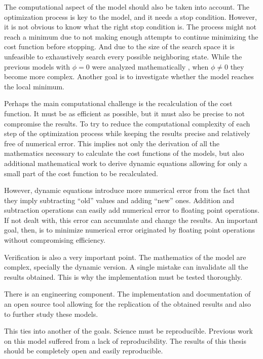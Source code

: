 The computational aspect of the model should also be taken into account.
The optimization process is key to the model, and it needs a stop condition.
However, it is not obvious to know what the right stop condition is.
The process might not reach a minimum due to not making enough attempts to continue minimizing the cost function before stopping.
And due to the size of the search space it is unfeasible to exhaustively search every possible neighboring state.
While the previous models with $\phi=0$ were analyzed mathematically \cite{Salge2015} \cite{Prokopenko2010}, when $\phi \neq 0$ they become more complex.
Another goal is to investigate whether the model reaches the local minimum.

Perhaps the main computational challenge is the recalculation of the cost function.
It must be as efficient as possible, but it must also be precise to not compromise the results.
To try to reduce the computational complexity of each step of the optimization process while keeping the results precise and relatively free of numerical error.
This implies not only the derivation of all the mathematics necessary to calculate the cost functions of the models, but also additional mathematical work to derive dynamic equations allowing for only a small part of the cost function to be recalculated.

However, dynamic equations introduce more numerical error from the fact that they imply subtracting ``old'' values and adding ``new'' ones.
Addition and subtraction operations can easily add numerical error to floating point operations.
If not dealt with, this error can accumulate and change the results.
An important goal, then, is to minimize numerical error originated by floating point operations without compromising efficiency.

Verification is also a very important point.
The mathematics of the model are complex, specially the dynamic version.
A single mistake can invalidate all the results obtained.
This is why the implementation must be tested thoroughly.

There is an engineering component.
The implementation and documentation of an open source tool allowing for the replication of the obtained results and also to further study these models.

This ties into another of the goals.
Science must be reproducible.
Previous work \cite{Ferrer2003a} \cite{Ferrer2005a} on this model suffered from a lack of reproducibility.
The results of this thesis should be completely open and easily reproducible.

